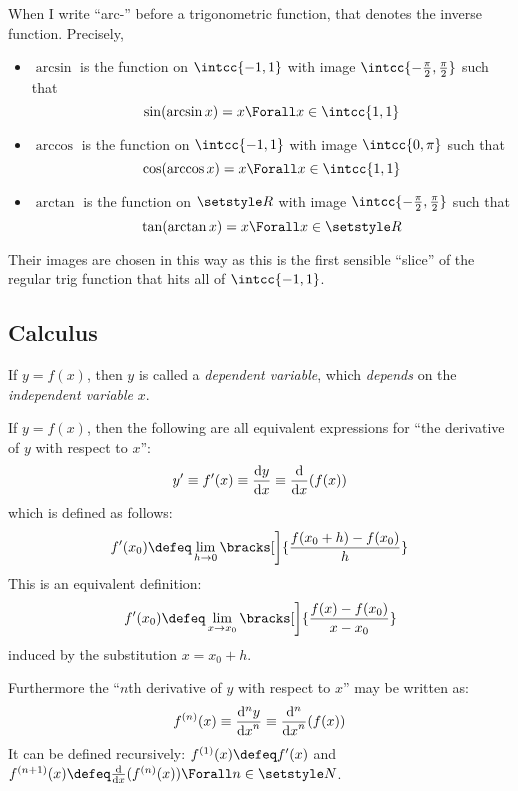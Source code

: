When I write ``arc-'' before a trigonometric function, that denotes the inverse
function. Precisely,
\begin{itemize}
 \item
  \(\arcsin\) is the function on \(\intcc{-1, 1}\) with image
  \(\intcc{-\frac \pi 2, \frac \pi 2}\) such that
  \begin{equation*}
   \sin(\arcsin x) = x \Forall x \in \intcc{1, 1}
  \end{equation*}
 \item
  \(\arccos\) is the function on \(\intcc{-1, 1}\) with image
  \(\intcc{0, \pi}\) such that
  \begin{equation*}
   \cos(\arccos x) = x \Forall x \in \intcc{1, 1}
  \end{equation*}
 \item
  \(\arctan\) is the function on \(\Reals\) with image
  \(\intcc{-\frac \pi 2, \frac \pi 2}\) such that
  \begin{equation*}
   \tan(\arctan x) = x \Forall x \in \Reals
  \end{equation*}
\end{itemize}
Their images are chosen in this way as this is the first sensible ``slice'' of
the regular trig function that hits all of \(\intcc{-1, 1}\).

\subsection{Calculus}

If \(y = f(x)\), then \(y\) is called a \emph{dependent variable}, which
\emph{depends} on the \emph{independent variable} \(x\).

If \(y = f(x)\), then the following are all equivalent expressions for ``the
derivative of \(y\) with respect to \(x\)'':
\begin{equation*}
 y'
 \equiv f'(x)
 \equiv \dv<y>{x}
 \equiv \dv{x}(f(x))
\end{equation*}
which is defined as follows:
\begin{equation*}
 f'(x_0) \defeq
  \lim_{h \to 0}
   \bracks[\bigg]{
    \frac{f(x_0 + h) - f(x_0)} h
   }
\end{equation*}
This is an equivalent definition:
\begin{equation*}
 f'(x_0) \defeq
  \lim_{x \to x_0}
  \bracks[\bigg]{
   \frac{f(x) - f(x_0)}{x - x_0}
  }
\end{equation*}
induced by the substitution \(x = x_0 + h\).

Furthermore the ``\(n\)th derivative of \(y\) with respect to \(x\)'' may be
written as:
\begin{equation*}
 f^{(n)}(x)
 \equiv \dv[n]<y>{x}
 \equiv \dv[n]{x}(f(x))
\end{equation*}
It can be defined recursively: \(f^{(1)}(x) \defeq f'(x)\) and
\(f^{(n + 1)}(x) \defeq \dv{x}(f^{(n)}(x)) \Forall n \in \Naturals\).

